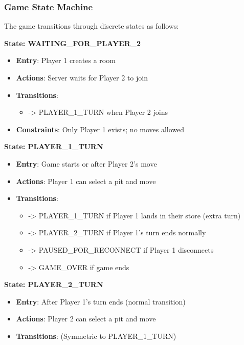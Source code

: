 \documentclass{scrartcl}
\begin{document}
\subsubsection{Game State Machine}

The game transitions through discrete states as follows:

\textbf{State: WAITING\_FOR\_PLAYER\_2}
\begin{itemize}
  \item \textbf{Entry}: Player 1 creates a room
  \item \textbf{Actions}: Server waits for Player 2 to join
  \item \textbf{Transitions}:
  \begin{itemize}
    \item -> PLAYER\_1\_TURN when Player 2 joins
  \end{itemize}
  \item \textbf{Constraints}: Only Player 1 exists; no moves allowed
\end{itemize}

\textbf{State: PLAYER\_1\_TURN}
\begin{itemize}
  \item \textbf{Entry}: Game starts or after Player 2's move
  \item \textbf{Actions}: Player 1 can select a pit and move
  \item \textbf{Transitions}:
  \begin{itemize}
    \item -> PLAYER\_1\_TURN if Player 1 lands in their store (extra turn)
    \item -> PLAYER\_2\_TURN if Player 1's turn ends normally
    \item -> PAUSED\_FOR\_RECONNECT if Player 1 disconnects
    \item -> GAME\_OVER if game ends
  \end{itemize}
\end{itemize}

\textbf{State: PLAYER\_2\_TURN}
\begin{itemize}
  \item \textbf{Entry}: After Player 1's turn ends (normal transition)
  \item \textbf{Actions}: Player 2 can select a pit and move
  \item \textbf{Transitions}: (Symmetric to PLAYER\_1\_TURN)
\end{itemize}
\end{document}
